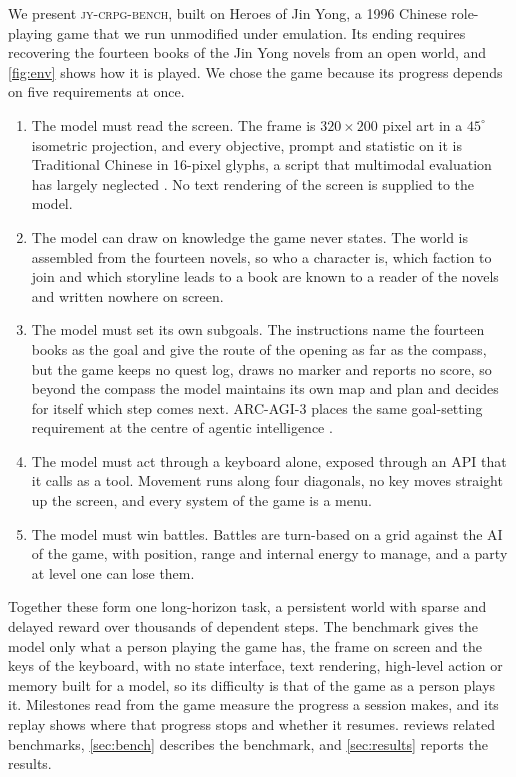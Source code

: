 \documentclass{article} %
\newcommand{\bench}{\textsc{jy-crpg-bench}}
\begin{document}
We present \bench{}, built on Heroes of Jin Yong, a 1996 Chinese role-playing game that we run unmodified under emulation. Its ending requires recovering the fourteen books of the Jin Yong novels from an open world, and \cref{fig:env} shows how it is played. We chose the game because its progress depends on five requirements at once.
\begin{enumerate}[leftmargin=*,topsep=2pt,itemsep=1pt,parsep=0pt]
\item The model must read the screen. The frame is $320\times200$ pixel art in a $45^\circ$ isometric projection, and every objective, prompt and statistic on it is Traditional Chinese in 16-pixel glyphs, a script that multimodal evaluation has largely neglected \citep{tam2025vistw}. No text rendering of the screen is supplied to the model.
\item The model can draw on knowledge the game never states. The world is assembled from the fourteen novels, so who a character is, which faction to join and which storyline leads to a book are known to a reader of the novels and written nowhere on screen.
\item The model must set its own subgoals. The instructions name the fourteen books as the goal and give the route of the opening as far as the compass, but the game keeps no quest log, draws no marker and reports no score, so beyond the compass the model maintains its own map and plan and decides for itself which step comes next. ARC-AGI-3 places the same goal-setting requirement at the centre of agentic intelligence \citep{arc2026arcagi3}.
\item The model must act through a keyboard alone, exposed through an API that it calls as a tool. Movement runs along four diagonals, no key moves straight up the screen, and every system of the game is a menu.
\item The model must win battles. Battles are turn-based on a grid against the AI of the game, with position, range and internal energy to manage, and a party at level one can lose them.
\end{enumerate}
Together these form one long-horizon task, a persistent world with sparse and delayed reward over thousands of dependent steps. The benchmark gives the model only what a person playing the game has, the frame on screen and the keys of the keyboard, with no state interface, text rendering, high-level action or memory built for a model, so its difficulty is that of the game as a person plays it. Milestones read from the game measure the progress a session makes, and its replay shows where that progress stops and whether it resumes.  reviews related benchmarks, \cref{sec:bench} describes the benchmark, and \cref{sec:results} reports the results.
\end{document}
